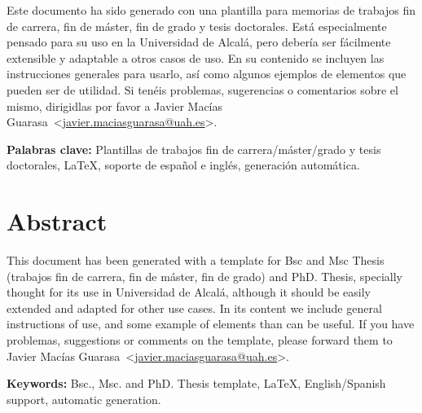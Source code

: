 \documentclass[spanish,openright]{book}
\makeatletter
\newcommand{\clearemptydoublepage}{\newpage{\pagestyle{empty}\cleardoublepage}}
\newcommand{\myLanguage}{english}
\newcommand{\myThesisKeywords}{Plantillas de trabajos fin de carrera/máster/grado y tesis doctorales, \LaTeX, soporte de español e inglés, generación automática} \newcommand{\myThesisKeywordsEnglish}{Bsc., Msc. and PhD. Thesis template, \LaTeX, English/Spanish support, automatic generation} \newcommand{\myConfidentialContent}{No}
\newcommand{\myAuthorName}{Javier}
\newcommand{\myAuthorSurname}{Macías Guarasa}
\newcommand{\myAuthorFullName}{\myAuthorName{} \myAuthorSurname{}}
\newcommand{\myAuthorEmail}{javier.maciasguarasa@uah.es}
\newcommand{\mytoclinkcolor}{black}
\newcommand{\myloflinkcolor}{black}
\newcommand{\mylotlinkcolor}{black}
\newcommand{\myothertoclinkcolor}{black}
\newcommand{\mylinkcolor}{blue}
\newcommand{\contactauthor}{\myAuthorFullName~\textless\href{mailto:\myAuthorEmail}{\myAuthorEmail}\textgreater}
\makeatother
\begin{document}
Este documento ha sido generado con una plantilla para memorias de
trabajos fin de carrera, fin de máster, fin de grado y tesis
doctorales. Está especialmente pensado para su uso en la Universidad de
Alcalá, pero debería ser fácilmente extensible y adaptable a otros casos
de uso. En su contenido se incluyen las instrucciones generales para
usarlo, así como algunos ejemplos de elementos que pueden ser de
utilidad. Si tenéis problemas, sugerencias o comentarios sobre el mismo,
dirigidlas por favor a \contactauthor.

\textbf{Palabras clave:} \myThesisKeywords.






\chapter*{Abstract}
\label{cha:abstract}


This document has been generated with a template for Bsc and Msc Thesis
(trabajos fin de carrera, fin de máster, fin de grado) and PhD. Thesis,
specially thought for its use in Universidad de Alcalá, although it
should be easily extended and adapted for other use cases. In its
content we include general instructions of use, and some example of
elements than can be useful. If you have problemas, suggestions or
comments on the template, please forward them to \contactauthor.


\textbf{Keywords:} \myThesisKeywordsEnglish.










\clearemptydoublepage
\hypersetup{linkcolor=\mytoclinkcolor}
\tableofcontents

\clearemptydoublepage
\hypersetup{linkcolor=\myloflinkcolor}
\listoffigures

\clearemptydoublepage
\hypersetup{linkcolor=\mylotlinkcolor}
\listoftables

\hypersetup{linkcolor=\mylinkcolor}





\hypersetup{linkcolor=\myothertoclinkcolor}
\ifthenelse{\equal{\myLanguage}{english}}
{
}
{
}
\end{document}
